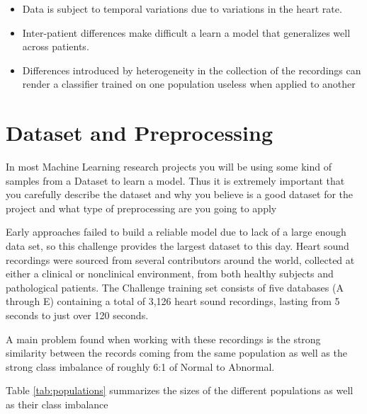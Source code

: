\documentclass[11pt,letterpaper]{article}
\begin{document}
\begin{itemize}
    \item Data is subject to temporal variations due to variations in the heart rate.
    \item Inter-patient differences make difficult a learn a model that generalizes well across patients.
    \item Differences introduced by heterogeneity in the collection of the recordings can render a classifier trained on one population useless when applied to another
\end{itemize}


\section{Dataset and Preprocessing} %
\label{sec:dataset_and_preprocessing}

\begin{tip}
In most Machine Learning research projects you will be using some kind of samples from a Dataset to learn a model. Thus it is extremely important that you carefully describe the dataset and why you believe is a good dataset for the project and what type of preprocessing are you going to apply
\end{tip}

Early approaches failed to build a reliable model due to lack of a large enough data set, so this challenge provides the largest dataset to this day. Heart sound recordings were sourced from several contributors around the world, collected at either a clinical or nonclinical environment, from both healthy subjects and pathological patients. The Challenge training set consists of five databases (A through E) containing a total of 3,126 heart sound recordings, lasting from 5 seconds to just over 120 seconds.

A main problem found when working with these recordings is the strong similarity between the records coming from the same population  as well as the strong class imbalance of roughly 6:1 of Normal to Abnormal.

Table \ref{tab:populations} summarizes the sizes of the different populations as well as their class imbalance
\end{document}
